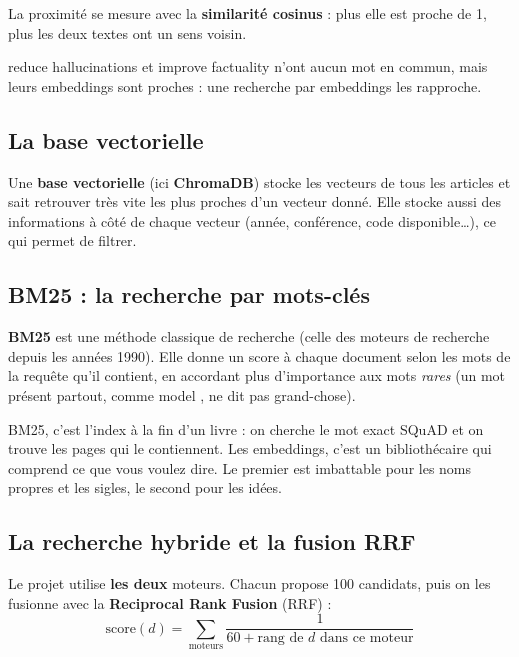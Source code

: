 \documentclass[11pt,a4paper]{article}
\begin{document}
La proximité se mesure avec la \textbf{similarité cosinus} : plus elle est proche de 1, plus
les deux textes ont un sens voisin.

\begin{exemple}
\og reduce hallucinations \fg{} et \og improve factuality \fg{} n'ont aucun mot en commun,
mais leurs embeddings sont proches : une recherche par embeddings les rapproche.
\end{exemple}

\subsection{La base vectorielle}

Une \textbf{base vectorielle} (ici \textbf{ChromaDB}) stocke les vecteurs de tous les
articles et sait retrouver très vite les plus proches d'un vecteur donné. Elle stocke aussi
des informations à côté de chaque vecteur (année, conférence, code disponible\ldots), ce qui
permet de filtrer.

\subsection{BM25 : la recherche par mots-clés}

\textbf{BM25} est une méthode classique de recherche (celle des moteurs de recherche depuis
les années 1990). Elle donne un score à chaque document selon les mots de la requête qu'il
contient, en accordant plus d'importance aux mots \emph{rares} (un mot présent partout,
comme \og model \fg{}, ne dit pas grand-chose).

\begin{analogie}
BM25, c'est l'index à la fin d'un livre : on cherche le mot exact \og SQuAD \fg{} et on
trouve les pages qui le contiennent. Les embeddings, c'est un bibliothécaire qui comprend
ce que vous voulez dire. Le premier est imbattable pour les noms propres et les sigles, le
second pour les idées.
\end{analogie}

\subsection{La recherche hybride et la fusion RRF}

Le projet utilise \textbf{les deux} moteurs. Chacun propose 100 candidats, puis on les
fusionne avec la \textbf{Reciprocal Rank Fusion} (RRF) :
\[
\text{score}(d) = \sum_{\text{moteurs}} \frac{1}{60 + \text{rang de } d \text{ dans ce moteur}}
\]
\end{document}
